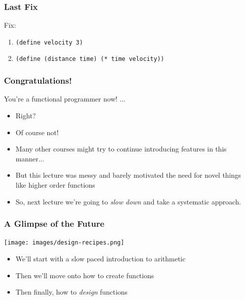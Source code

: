 \documentclass{beamer}
\begin{document}
\begin{frame}
  \frametitle{Last Fix}
  Fix:
  \begin{enumerate}
  \item<1-> \texttt{(define velocity 3)}
  \item<2-> \texttt{(define (distance time) (* time velocity))}
  \end{enumerate}
  \pause
  \versionFive
\end{frame}

\begin{frame}
  \frametitle{Congratulations!}
  You're a functional programmer now! ...
  \begin{itemize}
  \item<1-> Right?
  \item<2-> Of course not!
  \item<3-> Many other courses might try to continue introducing features in this manner...
  \item<4-> But this lecture was messy and barely motivated the need for novel
    things like higher order functions
  \item<5-> So, next lecture we're going to \emph{slow down} and take a systematic
    approach.
  \end{itemize}
\end{frame}

\begin{frame}
  \frametitle{A Glimpse of the Future}
  \begin{center}
    \texttt{[image: images/design-recipes.png]}
  \end{center}
  \begin{itemize}
  \item We'll start with a slow paced introduction to arithmetic
  \item Then we'll move onto how to create functions
  \item Then finally, how to \emph{design} functions
  \end{itemize}
\end{frame}
\end{document}

